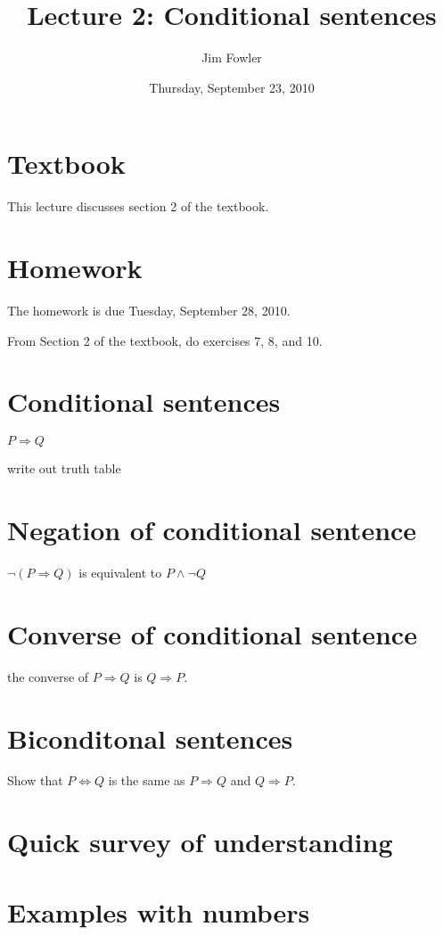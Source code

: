 \documentclass[12pt]{handout}
\title{Lecture 2: Conditional sentences}
\author{Jim Fowler}
\date{Thursday, September 23, 2010}
\begin{document}
\maketitle

\section*{Textbook}

This lecture discusses section 2 of the textbook.

\section*{Homework} 

The homework is due Tuesday, September 28, 2010.

From Section 2 of the textbook, do exercises 7, 8, and 10.

\section*{Conditional sentences}

$P \Rightarrow Q$

write out truth table

\section*{Negation of conditional sentence}

$\neg (P \Rightarrow Q)$ is equivalent to $P \wedge \neg Q$

\section*{Converse of conditional sentence}

the converse of $P \Rightarrow Q$ is $Q \Rightarrow P$.

\section*{Biconditonal sentences}

Show that $P \Leftrightarrow Q$ is the same as $P \Rightarrow Q$ and $Q \Rightarrow P$.

\section*{Quick survey of understanding}

\section*{Examples with numbers}
\end{document}

